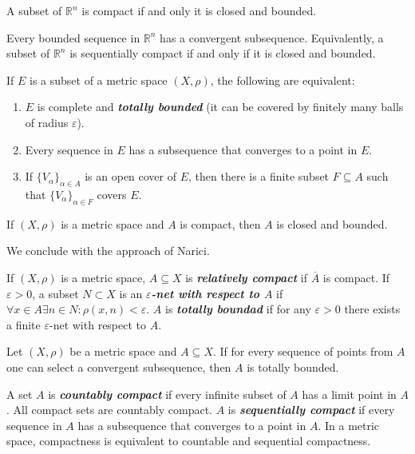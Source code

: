 \documentclass{article}
\theoremstyle{definition}
\numberwithin{equation}{section}
\newcommand{\R}{\mathbb{R}}
\begin{document}
		\begin{thm}
			A subset of $\R^n$ is compact if and only it is closed and bounded.
		\end{thm}
		\begin{thm}
			Every bounded sequence in $\R^n$ has a convergent subsequence. Equivalently, a subset of $\R^n$ is sequentially compact if and only if it is closed and bounded.
		\end{thm}
			\begin{thm}
			If $E$ is a subset of a metric space $(X,\rho)$, the following are equivalent:
			\begin{enumerate}
				\item $E$ is complete and \textbf{\textit{totally bounded}} (it can be covered by finitely many balls of radius $\varepsilon$).
				\item Every sequence in $E$ has a subsequence that converges to a point in $E$.
				\item If $\{V_\alpha\}_{\alpha\in A}$ is an open cover of $E$, then there is a finite subset $F\subseteq A$ such that $\{V_\alpha\}_{\alpha\in F}$ covers $E$.
			\end{enumerate}
		\end{thm}
		\begin{thm}
			If $(X,\rho)$ is a metric space and $A$ is compact, then $A$ is closed and bounded.
		\end{thm}
		We conclude with the approach of Narici.
		
		If $(X,\rho)$ is a metric space, $A\subseteq X$ is \textbf{\textit{relatively compact}} if $\overline{A}$ is compact. If $\varepsilon>0$, a subset $N\subset X$ is an \textbf{\textit{$\varepsilon$-net with respect to $A$}} if $\forall x\in A\exists n\in N:\rho(x,n)<\varepsilon$. $A$ is \textbf{\textit{totally boundad}} if for any $\varepsilon>0$ there exists a finite $\varepsilon$-net with respect to $A$.
		
		\begin{thm}
			Let $(X,\rho)$ be a metric space and $A\subseteq X$. If for every sequence of points from $A$ one can select a convergent subsequence, then $A$ is totally bounded.
		\end{thm}
		A set $A$ is \textbf{\textit{countably compact}} if every infinite subset of $A$ has a limit point in $A$. All compact sets are countably compact. $A$ is \textbf{\textit{sequentially compact}} if every sequence in $A$ has a subsequence that converges to a point in $A$. In a metric space, compactness is equivalent to countable and sequential compactness.
		
\end{document}
